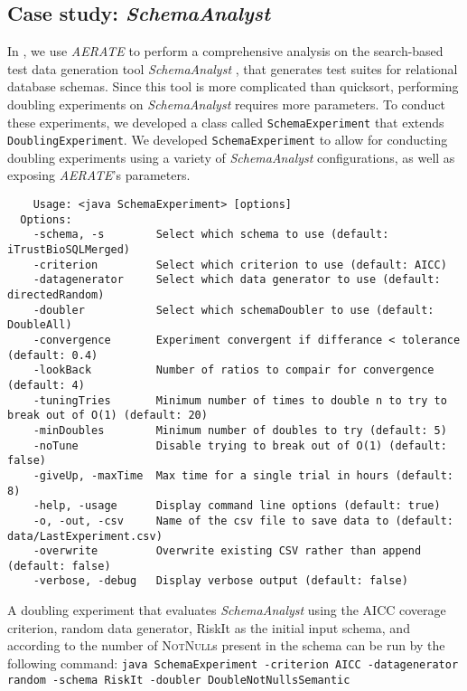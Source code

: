 \documentclass[10pt,twocolumn]{article}
\begin{document}
    \subsection{Case study: \textit{SchemaAnalyst}}
    In \cite{kinneer2015}, we use \textit{AERATE} to perform a
    comprehensive analysis on the search-based test data generation 
    tool \textit{SchemaAnalyst} \cite{kapfhammer2013}, that generates
    test suites for relational database schemas. Since this tool is more
    complicated than quicksort, performing doubling experiments on
    \textit{SchemaAnalyst} requires more parameters.  To conduct these
    experiments, we developed a class called \texttt{SchemaExperiment}
    that extends \texttt{DoublingExperiment}.  We developed 
    \texttt{SchemaExperiment} to allow for conducting doubling
    experiments using a variety of \textit{SchemaAnalyst} configurations,
    as well as exposing \textit{AERATE}'s parameters.
{
\tiny
    \begin{verbatim}
    Usage: <java SchemaExperiment> [options]
  Options:  
    -schema, -s        Select which schema to use (default: iTrustBioSQLMerged)
    -criterion         Select which criterion to use (default: AICC)
    -datagenerator     Select which data generator to use (default: directedRandom)
    -doubler           Select which schemaDoubler to use (default: DoubleAll)
    -convergence       Experiment convergent if differance < tolerance (default: 0.4)
    -lookBack          Number of ratios to compair for convergence (default: 4)
    -tuningTries       Minimum number of times to double n to try to break out of O(1) (default: 20)
    -minDoubles        Minimum number of doubles to try (default: 5)
    -noTune            Disable trying to break out of O(1) (default: false)
    -giveUp, -maxTime  Max time for a single trial in hours (default: 8)
    -help, -usage      Display command line options (default: true)
    -o, -out, -csv     Name of the csv file to save data to (default: data/LastExperiment.csv)
    -overwrite         Overwrite existing CSV rather than append (default: false)
    -verbose, -debug   Display verbose output (default: false)
    \end{verbatim}
    }

    A doubling experiment that evaluates \textit{SchemaAnalyst} using
    the AICC coverage criterion, random data generator, RiskIt as the initial input
    schema, and according to the number of \textsc{NotNull}s present in the
    schema can be run by the following command:
    \texttt{java SchemaExperiment -criterion AICC -datagenerator random -schema RiskIt -doubler DoubleNotNullsSemantic}
\end{document}
